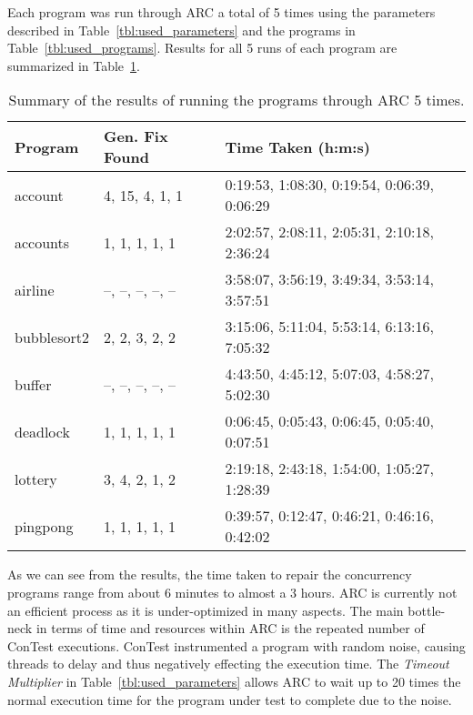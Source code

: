 Each program was run through ARC a total of 5 times using the parameters
described in Table~\ref{tbl:used_parameters} and the programs in
Table~\ref{tbl:used_programs}. Results for all 5 runs of each program are summarized in
Table~\ref{tbl:summary_results}.

\begin{table}[t!]
\caption{Summary of the results of running the programs through ARC 5 times.}
\begin{center}
\lstset{basicstyle=\scriptsize}
\begin{tabular}{|l|l|l|}
\hline
\textbf{Program} & \textbf{Gen. Fix Found} & \textbf{Time Taken (h:m:s)}\\
\hline
account & 4, 15, 4, 1, 1 & 0:19:53, 1:08:30, 0:19:54, 0:06:39, 0:06:29\\
\hline
accounts & 1, 1, 1, 1, 1 & 2:02:57, 2:08:11, 2:05:31, 2:10:18, 2:36:24\\
\hline
airline & --, --, --, --, -- & 3:58:07, 3:56:19, 3:49:34, 3:53:14, 3:57:51\\
\hline
bubblesort2 & 2, 2, 3, 2, 2 & 3:15:06, 5:11:04, 5:53:14, 6:13:16, 7:05:32 \\
\hline
buffer & --, --, --, --, -- & 4:43:50, 4:45:12, 5:07:03, 4:58:27, 5:02:30\\
\hline
deadlock & 1, 1, 1, 1, 1 & 0:06:45, 0:05:43, 0:06:45, 0:05:40, 0:07:51\\
\hline
lottery & 3, 4, 2, 1, 2 & 2:19:18, 2:43:18, 1:54:00, 1:05:27, 1:28:39\\
\hline
pingpong & 1, 1, 1, 1, 1 & 0:39:57, 0:12:47, 0:46:21, 0:46:16, 0:42:02\\
\hline
\end{tabular}
\label{tbl:summary_results}
\end{center}
\end{table}

As we can see from the results, the time taken to repair the concurrency programs range from about 6
minutes to almost a 3 hours. ARC is currently not an efficient process as it is
under-optimized in many aspects. The main bottle-neck in terms of time and
resources within ARC is the repeated number of ConTest executions. ConTest
instrumented a program with random noise, causing threads to delay and thus negatively effecting the
execution time.  The \textit{Timeout Multiplier} in
Table~\ref{tbl:used_parameters} allows ARC to wait up to 20 times the normal
execution time for the program under test to complete due to the noise.

